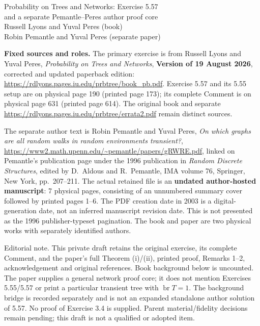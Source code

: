 \documentclass[11pt]{article}
\newcommand{\br}{\operatorname{br}}
\newcommand{\editorial}[1]{\par\smallskip\noindent\textsf{Editorial note.} #1\par\smallskip}
\begin{document}
\begin{center}
{\large Probability on Trees and Networks: Exercise 5.57\\[2pt]
and a separate Pemantle--Peres author proof core}\\[4pt]
Russell Lyons and Yuval Peres (book)\\
Robin Pemantle and Yuval Peres (separate paper)
\end{center}

\small
\noindent\textbf{Fixed sources and roles.}
The primary exercise is from Russell Lyons and Yuval Peres,
\emph{Probability on Trees and Networks}, \textbf{Version of 19 August 2026},
corrected and updated paperback edition:
\url{https://rdlyons.pages.iu.edu/prbtree/book_pb.pdf}.
Exercise 5.57 and its 5.55 setup are on physical page 190 (printed page 173);
its complete Comment is on physical page 631 (printed page 614).
The original book and separate \url{https://rdlyons.pages.iu.edu/prbtree/errata2.pdf}
remain distinct sources.

The separate author text is Robin Pemantle and Yuval Peres,
\emph{On which graphs are all random walks in random environments transient?},
\url{https://www2.math.upenn.edu/~pemantle/papers/gRWRE.pdf}, linked on
Pemantle's publication page under the 1996 publication in
\emph{Random Discrete Structures}, edited by D.~Aldous and R.~Pemantle,
IMA volume 76, Springer, New York, pp.~207--211.
The actual retained file is an \textbf{undated author-hosted manuscript}:
7 physical pages, consisting of an unnumbered summary cover followed by
printed pages 1--6. The PDF creation date in 2003 is a digital-generation
date, not an inferred manuscript revision date. This is not presented as the
1996 publisher-typeset pagination. The book and paper are two physical works
with separately identified authors.

\editorial{This private draft retains the original exercise, its complete
Comment, and the paper's full Theorem (i)/(ii), printed proof, Remarks 1--2,
acknowledgement and original references. Book background below is uncounted.
The paper supplies a general network proof core; it does not mention
Exercises 5.55/5.57 or print a particular transient tree with $\br T=1$.
The background bridge is recorded separately and is not an expanded
standalone author solution of 5.57. No proof of Exercise 3.4 is supplied.
Parent material/fidelity decisions remain pending; this draft is not a
qualified or adopted item.}
\end{document}
